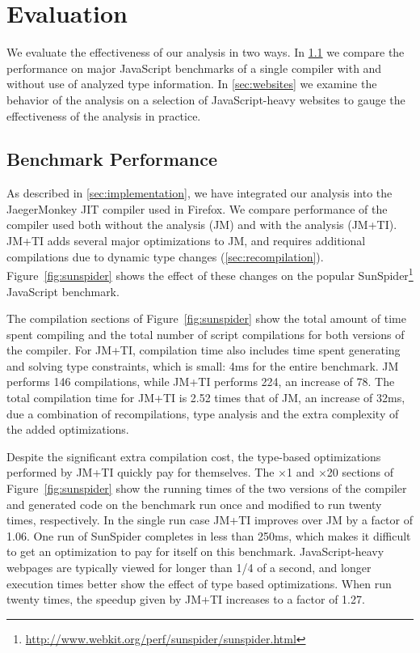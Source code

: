 \section{Evaluation}
\label{sec:evaluation}

We evaluate the effectiveness of our analysis in two ways.
In \Section\ref{sec:benchmarks} we compare the performance on major JavaScript benchmarks
of a single compiler with and without use of analyzed type information.
In \Section\ref{sec:websites} we examine the behavior of the analysis on a selection of
JavaScript-heavy websites to gauge the effectiveness of the analysis in practice.

\subsection{Benchmark Performance}
\label{sec:benchmarks}


As described in \Section\ref{sec:implementation}, we have integrated our analysis into
the JaegerMonkey JIT compiler used in Firefox.
We compare performance of the compiler used both without the analysis (JM)
and with the analysis (JM+TI).
JM+TI adds several major optimizations to JM,
and requires additional compilations due to dynamic type changes
(\Section\ref{sec:recompilation}).
Figure~\ref{fig:sunspider} shows the effect of these changes on the popular
SunSpider\footnote{\url{http://www.webkit.org/perf/sunspider/sunspider.html}} JavaScript benchmark.

The compilation sections of Figure~\ref{fig:sunspider} show the total amount of time
spent compiling and the total number of script compilations for both versions of
the compiler.
For JM+TI, compilation time also includes time spent generating and solving
type constraints, which is small: 4ms for the entire benchmark.
JM performs 146 compilations, while JM+TI performs 224, an increase of 78.
The total compilation time for JM+TI is 2.52 times that of JM, an increase
of 32ms, due a combination of recompilations, type analysis and the extra
complexity of the added optimizations.

Despite the significant extra compilation cost, the type-based optimizations
performed by JM+TI quickly pay for themselves. The $\times$1 and
$\times$20 sections
of Figure~\ref{fig:sunspider} show the running times of the two versions of the
compiler and generated code on the benchmark run once and modified
to run twenty times, respectively.
In the single run case JM+TI improves over JM by a factor of 1.06.
One run of SunSpider completes in less than 250ms, which makes it
difficult to get an optimization to pay for itself on this benchmark.
JavaScript-heavy webpages are typically viewed for longer than
1/4 of a second, and longer execution times better show the effect
of type based optimizations.
When run twenty times, the speedup given by JM+TI increases to a factor of 1.27.

